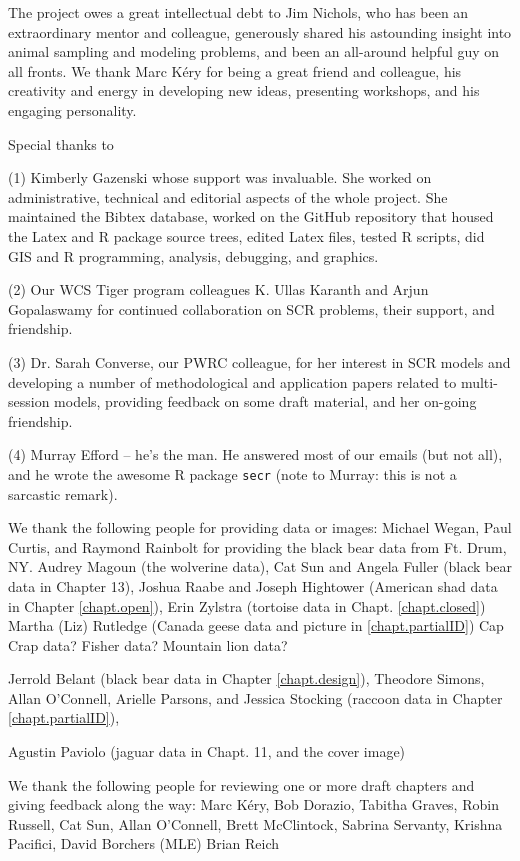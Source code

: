 
The project owes a great intellectual debt to Jim Nichols, who has
been an extraordinary mentor and colleague, generously shared his
astounding insight into animal sampling and modeling problems, and
been an all-around helpful guy on all fronts.  We thank Marc K\'{e}ry
for being a great friend and colleague, his creativity and energy in
developing new ideas, presenting workshops, and his engaging
personality.

Special thanks to

(1) Kimberly Gazenski whose support was invaluable. She worked on
administrative, technical and editorial aspects of the whole
project. She maintained the Bibtex database, worked on the GitHub
repository that housed the Latex and R package source trees, edited
Latex files, tested R scripts, did GIS and R programming, analysis,
debugging, and graphics.

(2) Our WCS Tiger program colleagues K. Ullas Karanth and Arjun
Gopalaswamy for continued collaboration on SCR problems, their
support, and friendship.

(3) Dr. Sarah Converse, our PWRC colleague, for her interest in SCR
models and developing a number of methodological and application
papers related to multi-session models, providing feedback on some
draft material, and her on-going friendship.

(4) Murray Efford -- he's the man. He answered most of our emails (but not
all), and he wrote the awesome R package \mbox{\tt secr} (note to Murray: this
is not a sarcastic remark).


We thank the following people for providing data or images:
Michael Wegan, Paul Curtis, and Raymond Rainbolt for providing the black bear data from Ft. Drum, NY. 
Audrey Magoun (the wolverine data), 
Cat Sun and Angela Fuller (black bear data in Chapter 13),
Joshua Raabe and Joseph Hightower (American shad data in Chapter \ref{chapt.open}),
Erin Zylstra (tortoise data in Chapt. \ref{chapt.closed})
Martha (Liz) Rutledge (Canada geese data and picture in \ref{chapt.partialID})
Cap Crap data? Fisher data?  Mountain lion data?

Jerrold Belant (black bear data in Chapter \ref{chapt.design}),
Theodore Simons, Allan O'Connell, Arielle Parsons, and Jessica Stocking (raccoon data in Chapter \ref{chapt.partialID}), 

Agustin Paviolo (jaguar data in Chapt. 11, and the cover image)

We thank the following people for reviewing one or more draft chapters
and giving feedback along the way:
Marc K\'{e}ry, 
Bob Dorazio,
Tabitha Graves,
Robin Russell,
Cat Sun,
Allan O'Connell,
Brett McClintock,
Sabrina Servanty,
Krishna Pacifici,
David Borchers (MLE)
Brian Reich
